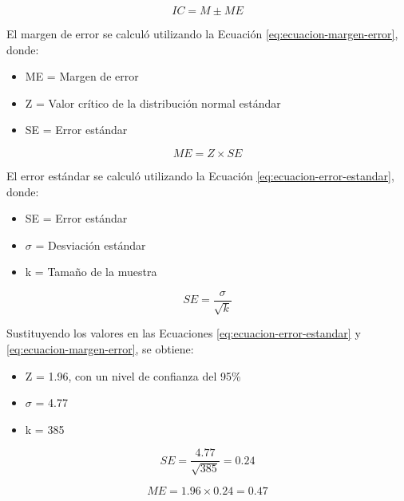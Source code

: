 \begin{equation}
    IC = M \pm ME
    \label{eq:ecuacion-intervalo-confianza}
\end{equation}

El margen de error se calculó utilizando la Ecuación \ref{eq:ecuacion-margen-error}, donde:

\begin{itemize}
    \item ME = Margen de error
    \item Z = Valor crítico de la distribución normal estándar
    \item SE = Error estándar
\end{itemize}

\begin{equation}
    ME = Z \times SE
    \label{eq:ecuacion-margen-error}
\end{equation}

El error estándar se calculó utilizando la Ecuación \ref{eq:ecuacion-error-estandar}, donde:

\begin{itemize}
    \item SE = Error estándar
    \item $\sigma$ = Desviación estándar
    \item k = Tamaño de la muestra
\end{itemize}

\begin{equation}
    SE = \frac{\sigma}{\sqrt{k}}
    \label{eq:ecuacion-error-estandar}
\end{equation}


Sustituyendo los valores en las Ecuaciones \ref{eq:ecuacion-error-estandar} y \ref{eq:ecuacion-margen-error}, se obtiene:

\begin{itemize}
    \item Z = 1.96, con un nivel de confianza del 95\%
    \item $\sigma$ = 4.77
    \item k = 385
\end{itemize}

\begin{equation}
    SE = \frac{4.77}{\sqrt{385}} = 0.24
    \label{eq:ecuacion-resultado-error-estandar}
\end{equation}

\begin{equation}
    ME = 1.96 \times 0.24 = 0.47
    \label{eq:ecuacion-resultado-margen-error}
\end{equation}

